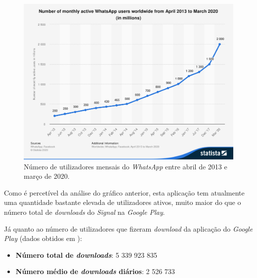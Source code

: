 \begin{figure}[H]
   \begin{center}
       \includegraphics[width=12cm]{img/statistic_id260819_number-of-monthly-active-whatsapp-users-as-of-2013-2020}
       \caption{Número de utilizadores mensais do \textit{WhatsApp} entre abril de 2013 e março de 2020. \cite{whatsapp_monthly_users}}
       \label{graph:whatsapp_monthly_active}
   \end{center}
\end{figure}

Como é percetível da análise do gráfico anterior, esta aplicação tem atualmente uma quantidade bastante elevada de utilizadores ativos, muito maior do que o número total de \textit{downloads} do \textit{Signal} na \textit{Google Play}.

Já quanto ao número de utilizadores que fizeram \textit{download} da aplicação do \textit{Google Play} (dados obtidos em \cite{whatsapp_downloads_android}):

\begin{itemize}
   \item \textbf{Número total de \textit{downloads}}: 5 339 923 835
   \item \textbf{Número médio de \textit{downloads} diários}: 2 526 733
\end{itemize}
